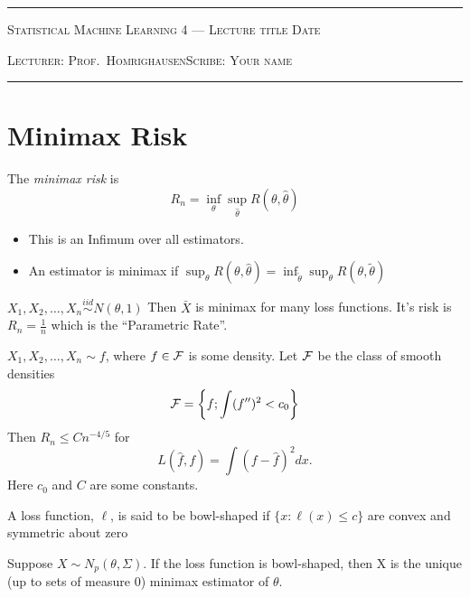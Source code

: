 \documentclass[10pt]{article}
\newcommand{\lecture}{Prof.\ Homrighausen}
\newcommand{\scribe}{Your name}
\newcommand{\chtitle}{Lecture title}
\newcommand{\lecdate}{Date}
\begin{document}
\rule{6.5in}{1pt}

\textsc{Statistical Machine Learning
  \hfill 4 --- \chtitle
  \hfill \lecdate}

\textsc{Lecturer: \lecture \hfill Scribe: \scribe}
\rule{6.5in}{1pt}


\section{Minimax Risk}


The {\em minimax risk} is 
\begin{equation}
  R_n = \inf_{\theta} \sup_{\hat\theta} R(\theta, \hat{\theta})
  \label{eq:1}
\end{equation}
\begin{itemize}
\item This is an Infimum over all estimators.
\item An estimator is minimax if $\sup_{\theta} R(\theta, \hat{\theta}) =
  \inf_{\tilde{\theta}} \sup_{\theta} R(\theta, \tilde{\theta})$
\end{itemize}

\begin{example}
  $X_1, X_2, \dots, X_n \overset{iid}{\sim} N(\theta, 1)$ Then $\bar X$
  is minimax for many loss functions. It's risk is $R_n = \frac{1}{n}$
  which is the ``Parametric Rate''.
\end{example}

\begin{example}
  $X_1, X_2,\dots, X_n \sim f$, where $f \in \mathcal{F}$ is some density. Let
  $\mathcal{F}$ be the class of smooth densities  
  \begin{equation}
    \mathcal{F} = \left\{ f ; \int (f'')^2 < c_0\right\}
  \end{equation}
  Then $R_n \leq C n^{-4/5}$ for 
  \begin{equation}
    L(\hat{f}, f) = \int(f-\hat{f})^2 dx.
  \end{equation}
  Here $c_0$ and $C$ are some constants.
\end{example}

\begin{definition}
  A loss function, $\ell$, is said to be bowl-shaped if $\{x: \ell(x)
  \le c\}$ are convex and symmetric about zero 
\end{definition}

\begin{theorem}
  Suppose $X\sim N_p(\theta, \Sigma)$. If the loss function is
  bowl-shaped, then X is the unique (up to sets of measure 0) minimax
  estimator of $\theta$. 
\end{theorem}
\end{document}
